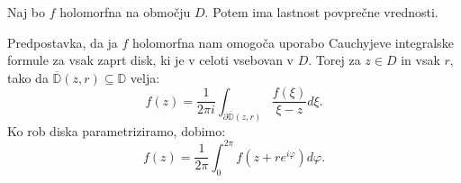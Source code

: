 \documentclass[mat1]{fmfdelo}
\begin{document}
    \begin{trditev}
        Naj bo $f$ holomorfna na območju $D$. Potem ima lastnost povprečne vrednosti.
    \end{trditev}
    \begin{dokaz}
        Predpostavka, da ja $f$ holomorfna nam omogoča uporabo Cauchyjeve integralske formule za vsak zaprt disk, ki je v celoti vsebovan v $D$. Torej za $z \in D$ in vsak $r$, tako da $\overline{\mathbb{D}}(z,r) \subseteq \mathbb{D}$ velja:
        $$
        f(z) = \frac{1}{2 \pi i} \int_{\partial \overline{\mathbb{D}}(z, r)}{\frac{f(\xi)}{\xi  - z}}d\xi.
        $$
        Ko rob diska parametriziramo, dobimo:
        $$
        f(z) = \frac{1}{2 \pi} \int_{0}^{2\pi}{f(z + re^{i\varphi})}d\varphi.
        $$
    \end{dokaz}
\end{document}
